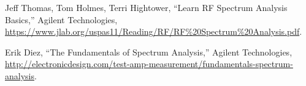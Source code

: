 \documentclass[letterpaper, 11pt]{article}
\begin{document}
\begin{thebibliography}{9}
 
Jeff Thomas, Tom Holmes, Terri Hightower, ``Learn RF Spectrum Analysis Basics,'' Agilent Technologies, \url{https://www.jlab.org/uspas11/Reading/RF/RF%20Spectrum%20Analysis.pdf}.

Erik Diez, ``The Fundamentals of Spectrum Analysis,'' Agilent Technologies, \url{http://electronicdesign.com/test-amp-measurement/fundamentals-spectrum-analysis}.


\end{thebibliography}
\end{document}
